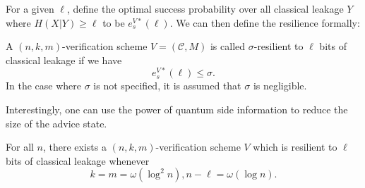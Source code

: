 For a given $\ell$, define the optimal success probability over all classical leakage $Y$ where $H(X|Y)\geq \ell$ to be $e_s^{V*}(\ell)$.
We can then define the resilience formally:

\begin{definition}
    \label{defn:vsec}
    A $(n,k,m)$-verification scheme $V=(\mathcal{C},M)$ is called $\sigma$-resilient to $\ell$ bits of classical leakage if we have
    $$e_s^{V*}(\ell)\leq \sigma.$$
    In the case where $\sigma$ is not specified, it is assumed that $\sigma$ is negligible.
\end{definition}

Interestingly, one can use the power of quantum side information to reduce the size of the advice state.

\begin{theorem}
    For all $n$, there exists a $(n,k,m)$-verification scheme $V$ which is resilient to $\ell$ bits of classical leakage whenever $$k=m=\omega(\log^2n), n-\ell=\omega(\log n).$$
\end{theorem}

